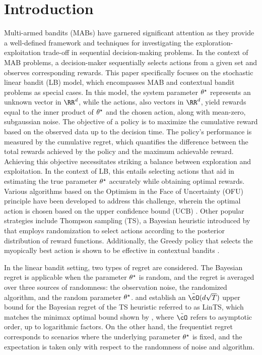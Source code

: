 \section{Introduction}




Multi-armed bandits (MABs) have garnered significant attention as they provide a well-defined framework and techniques for investigating the exploration-exploitation trade-off in sequential decision-making problems. In the context of MAB problems, a decision-maker sequentially selects actions from a given set and observes corresponding rewards. This paper specifically focuses on the stochastic linear bandit (LB) model, which encompasses MAB and contextual bandit problems as special cases. In this model, the system parameter $\theta^\star$ represents an unknown vector in $\RR^d$, while the actions, also vectors in $\RR^d$, yield rewards equal to the inner product of $\theta^\star$ and the chosen action, along with mean-zero, subgaussian noise.
	The objective of a policy is to maximize the cumulative reward based on the observed data up to the decision time. The policy's performance is measured by the cumulative regret, which quantifies the difference between the total rewards achieved by the policy and the maximum achievable reward. Achieving this objective necessitates striking a balance between exploration and exploitation. In the context of LB, this entails selecting actions that aid in estimating the true parameter $\theta^\star$ accurately while obtaining optimal rewards. Various algorithms based on the Optimism in the Face of Uncertainty (OFU) principle have been developed to address this challenge, wherein the optimal action is chosen based on the upper confidence bound (UCB) \citep{lai1985asymptotically}. Other popular strategies include Thompson sampling (TS), a Bayesian heuristic introduced by \cite{thompson1933likelihood} that employs randomization to select actions according to the posterior distribution of reward functions. Additionally, the Greedy policy that selects the myopically best action  is shown to be effective in contextual bandits \citep{kannan2018smoothed,raghavan2018externalities,hao2020adaptive, bastani2021mostly}.

In the linear bandit setting, two types of regret are considered. The Bayesian regret is applicable when the parameter $\theta^\star$ is random, and the regret is averaged over three sources of randomness: the observation noise, the randomized algorithm, and the random parameter $\theta^\star$. \cite{russo2014learning} and \cite{dong2018information} establish an $\tilde{\cO}(d \sqrt{T})$ upper bound for the Bayesian regret of the TS heuristic referred to as LinTS, which matches the minimax optimal bound shown by \cite{dani2008stochastic}, where $\tilde{\cO}$ refers to asymptotic order, up to logarithmic factors. On the other hand, the frequentist regret corresponds to scenarios where the underlying parameter $\theta^\star$ is fixed, and the expectation is taken only with respect to the randomness of noise and algorithm. %

